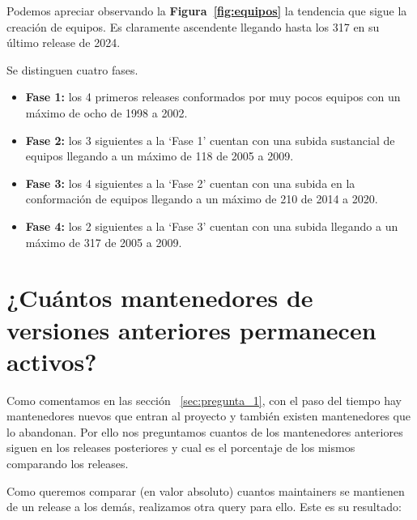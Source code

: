 \documentclass[a4paper, 12pt]{book}
\begin{document}
Podemos apreciar observando la \textbf{Figura~\ref{fig:equipos}} la tendencia que sigue la creación de equipos. Es claramente ascendente llegando hasta los 317 en su último release de 2024.

Se distinguen cuatro fases.
\begin{itemize}
	\item  \textbf{Fase 1:} los 4 primeros releases conformados por muy pocos equipos con un máximo de ocho de 1998 a 2002. 
	
	\item  \textbf{Fase 2:} los 3 siguientes a la `Fase 1' cuentan con una subida sustancial de equipos llegando a un máximo de 118 de 2005 a 2009.
	
	\item  \textbf{Fase 3:} los 4 siguientes a la `Fase 2' cuentan con una subida en la conformación de equipos llegando a un máximo de 210 de 2014 a 2020.
	
	\item  \textbf{Fase 4:} los 2 siguientes a la `Fase 3' cuentan con una subida  llegando a un máximo de 317 de 2005 a 2009.
	
\end{itemize}

\section{¿Cuántos mantenedores de versiones anteriores permanecen activos?}
\label{sec:pregunta_3}

Como comentamos en las sección ~\ref{sec:pregunta_1}, con el paso del tiempo hay mantenedores nuevos que entran al proyecto y también existen mantenedores que lo abandonan. Por ello nos preguntamos cuantos de los mantenedores anteriores siguen en los releases posteriores y cual es el porcentaje de los mismos comparando los releases.



Como queremos comparar (en valor absoluto) cuantos maintainers se mantienen de un release a los demás, realizamos otra query para ello.
Este es su resultado:
	

	
		
\end{document}
